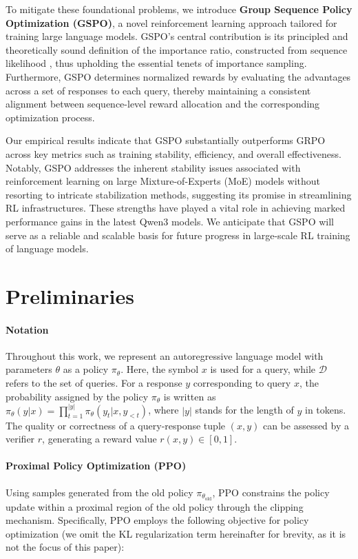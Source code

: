 To mitigate these foundational problems, we introduce \textbf{Group Sequence Policy Optimization (GSPO)}, a novel reinforcement learning approach tailored for training large language models. GSPO's central contribution is its principled and theoretically sound definition of the importance ratio, constructed from sequence likelihood \citep{click}, thus upholding the essential tenets of importance sampling. Furthermore, GSPO determines normalized rewards by evaluating the advantages across a set of responses to each query, thereby maintaining a consistent alignment between sequence-level reward allocation and the corresponding optimization process.

Our empirical results indicate that GSPO substantially outperforms GRPO across key metrics such as training stability, efficiency, and overall effectiveness. Notably, GSPO addresses the inherent stability issues associated with reinforcement learning on large Mixture-of-Experts (MoE) models without resorting to intricate stabilization methods, suggesting its promise in streamlining RL infrastructures. These strengths have played a vital role in achieving marked performance gains in the latest Qwen3 models. We anticipate that GSPO will serve as a reliable and scalable basis for future progress in large-scale RL training of language models.

\section{Preliminaries}

\paragraph{Notation}
Throughout this work, we represent an autoregressive language model with parameters $\theta$ as a policy $\pi_\theta$. Here, the symbol $x$ is used for a query, while $\mathcal{D}$ refers to the set of queries. For a response $y$ corresponding to query $x$, the probability assigned by the policy $\pi_\theta$ is written as $\pi_\theta (y | x)=\prod_{t=1}^{|y|} \pi_\theta (y_t | x, y_{<t} )$, where $|y|$ stands for the length of $y$ in tokens. The quality or correctness of a query-response tuple $(x, y)$ can be assessed by a verifier $r$, generating a reward value $r(x, y) \in [0, 1]$.

\paragraph{Proximal Policy Optimization (PPO)} Using samples generated from the old policy $\pi_{\theta_\text{old}}$, PPO \citep{ppo} constrains the policy update within a proximal region of the old policy through the clipping mechanism. Specifically, PPO employs the following objective for policy optimization (we omit the KL regularization term hereinafter for brevity, as it is not the focus of this paper):

